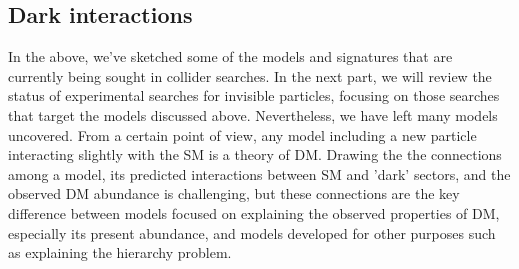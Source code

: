 
\subsection{Dark interactions}
\label{sec:darkint}

In the above, we've sketched some of the models and signatures that are currently being sought in collider searches. In the next part, we will review the status of experimental searches for invisible particles, focusing on those searches that target the models discussed above. Nevertheless, we have left many models uncovered. From a certain point of view, any model including a new particle interacting slightly with the SM is a theory of DM. Drawing the the connections among a model, its predicted interactions between SM and 'dark' sectors, and the observed DM abundance is challenging, but these connections are the key difference between models focused on explaining the observed properties of DM, especially its present abundance, and models developed for other purposes such as explaining the hierarchy problem. 

